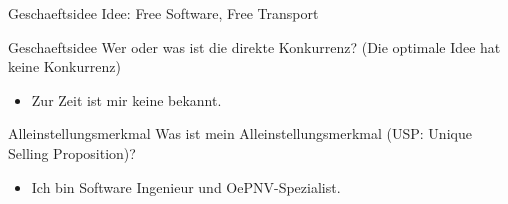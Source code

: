 
\begin{frame}{Geschaeftsidee}
  Idee: Free Software, Free Transport
\end{frame}

\begin{frame}{Geschaeftsidee}
  Wer oder was ist die direkte Konkurrenz? (Die optimale Idee hat keine Konkurrenz)
  \begin{itemize}
    \item Zur Zeit ist mir keine bekannt.
  \end{itemize}
\end{frame}

\begin{frame}{Alleinstellungsmerkmal}
  Was ist mein Alleinstellungsmerkmal (USP: Unique Selling Proposition)?
  \begin{itemize}
  \item Ich bin Software Ingenieur und OePNV-Spezialist.
  \end{itemize}
\end{frame}

